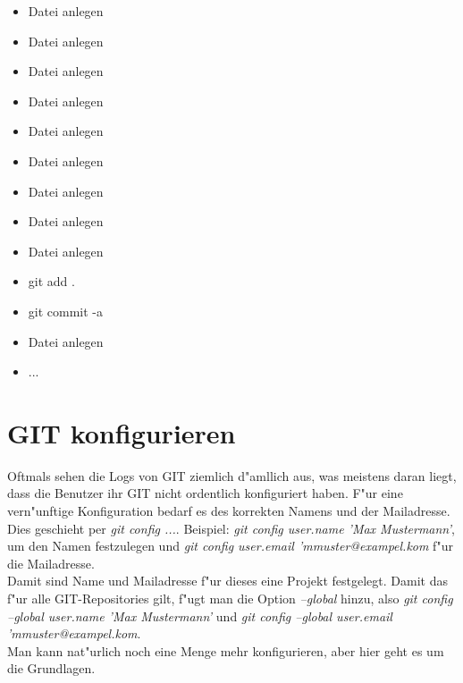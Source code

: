 \documentclass[german,a4paper]{report}
\begin{document}
\begin{itemize}
\item Datei anlegen
\item Datei anlegen
\item Datei anlegen
\item Datei anlegen
\item Datei anlegen
\item Datei anlegen
\item Datei anlegen
\item Datei anlegen
\item Datei anlegen
\item git add .
\item git commit -a
\item Datei anlegen
\item ...
\end{itemize}

\chapter{GIT konfigurieren}
Oftmals sehen die Logs von GIT ziemlich d"amllich aus, was meistens daran liegt, dass
die Benutzer ihr GIT nicht ordentlich konfiguriert haben. F"ur eine vern"unftige
Konfiguration bedarf es des korrekten Namens und der Mailadresse.\\
Dies geschieht per \textit{git config ...}. Beispiel:
\textit{git config user.name 'Max Mustermann'}, um den Namen festzulegen und
\textit{git config user.email 'mmuster@exampel.kom} f"ur die Mailadresse.\\
Damit sind Name und Mailadresse f"ur dieses eine Projekt festgelegt. Damit das
f"ur alle GIT-Repositories gilt, f"ugt man die Option \textit{--global} hinzu, also
\textit{git config --global user.name 'Max Mustermann'} und
\textit{git config --global user.email 'mmuster@exampel.kom}.\\
Man kann nat"urlich noch eine Menge mehr konfigurieren, aber hier geht es um die Grundlagen.
\end{document}
